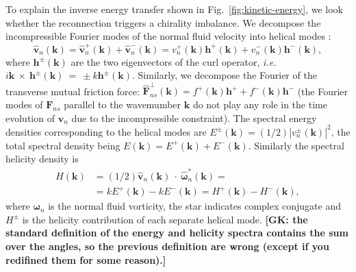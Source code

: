 \documentclass[%
 reprint,
 amsmath,amssymb,
 aps,
 prl,
]{revtex4-2}
\def \k{\mathbf{k}}
\def \h{\mathbf{h}}
\newcommand*{\NOTE}[1]{\textbf{\color{red}[#1]}}
\begin{document}
To explain the inverse energy transfer shown in Fig.~\ref{fig:kinetic-energy},
we look whether the reconnection triggers a chirality imbalance. 
We decompose the incompressible Fourier modes of the normal fluid velocity 
into helical modes \cite{waleffe-1992}:
\begin{equation}
\hat{\mathbf{v}}_n (\k) = \hat{\mathbf{v}}_n^+(\k) +\hat{\mathbf{v}}_n^-(\k)=
 v_n^+(\mathbf{k}) \mathbf{h}^+(\mathbf{k})+v_n^-(\mathbf{k}) \mathbf{h}^-(\mathbf{k}),
\end{equation}
%
where $\mathbf{h}^\pm (\mathbf{k})$ are the two eigenvectors of the curl 
operator, \textit{i.e.} $i\k~\times~\h^{\pm}(\k)~=~\pm k \h^{\pm}(\k)$. 
Similarly, we decompose the Fourier of the transverse mutual friction force:
$\hat{\mathbf{F}}_{ns}^{\perp}(\k) = f^+(\k) \mathbf{h}^+ + f^-(\k) \mathbf{h}^-$
(the  Fourier modes of $\mathbf{F}_{ns}$ parallel to the wavemumber 
$\k$ do not play any role in the time evolution of $\mathbf{v}_n$ 
due to the incompressible constraint). 
The spectral energy densities corresponding to the helical modes are
$E^{\pm}(\k) = (1/2) |v_n^\pm(\k)|^2$, the total spectral density 
being $E(\k) = E^{+}(\k) + E^{-}(\k)$. Similarly the spectral helicity 
density is 
\begin{equation}
\begin{split}
H(\k) & = (1/2) \hat{\mathbf{v}}_n (\k)\!\!\! ~\cdot~\!\!\! \hat{\bm{\omega}}_n^* (\k) = \\
& = k E^+(\k) - k E^-(\k)  = H^+(\k) - H^-(\k),
\end{split}
\end{equation}
where $\bm{\omega}_n$ is the normal fluid vorticity, the star indicates 
complex conjugate and $H^\pm$ is the helicity contribution of each 
separate helical mode. \NOTE{GK: the standard definition of the energy and helicity spectra contains the sum over the angles, so the previous definition are wrong (except if you redifined them for some reason).}
\end{document}
